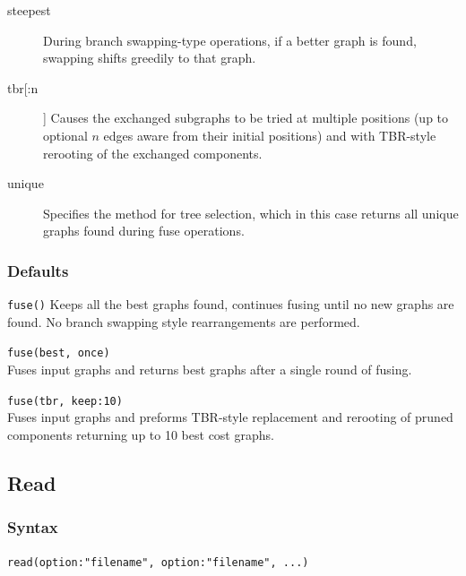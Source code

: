 \begin{description}
		\item [steepest] During branch swapping-type operations, if a better graph is found, swapping shifts greedily to
		that graph. 
		
		\item [tbr[:n]] Causes the exchanged subgraphs to be tried at multiple positions (up to optional 
		$n$ edges aware from their initial positions) and with TBR-style rerooting of the exchanged 
		components.
		
		\item [unique] Specifies the method for tree selection, which in this case returns all unique 
		graphs found during fuse operations.	
	\end{description}	
	
	\subsubsection{Defaults}
		\texttt{fuse()} Keeps all the best graphs found, continues fusing until no new graphs are found. 
		No branch swapping style rearrangements are performed.
	
	\begin{example}
	
		\item{\texttt{fuse(best, once)}\\Fuses input graphs and returns best graphs after a single round of 
		fusing.}
		
		\item{\texttt{fuse(tbr, keep:10)} \\Fuses input graphs and preforms TBR-style replacement and 
		rerooting of pruned components returning up to 10 best cost graphs.}
		
	\end{example}

\subsection{Read}
\label{subsec:read}
	\subsubsection{Syntax}
		\texttt{read(option:"filename", option:"filename", ...)}
			

